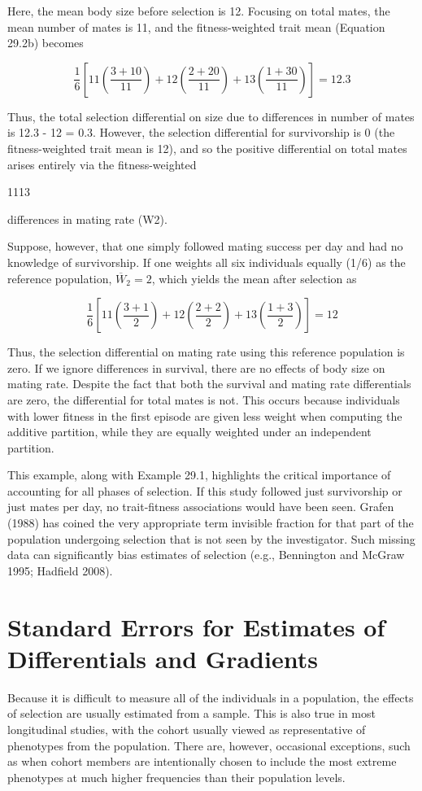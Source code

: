 \documentclass{article}
\begin{document}
Here, the mean body size before selection is 12. Focusing on total mates, the mean number of mates is 11, and the fitness-weighted trait mean (Equation 29.2b) becomes

\begin{equation}
\frac{1}{6}\left[11\left(\frac{3+10}{11}\right)+12\left(\frac{2+20}{11}\right)+13\left(\frac{1+30}{11}\right)\right]=12.3
\end{equation}

Thus, the total selection differential on size due to differences in number of mates is 12.3 - 12 = 0.3. However, the selection differential for survivorship is 0 (the fitness-weighted trait mean is 12), and so the positive differential on total mates arises entirely via the fitness-weighted

1113

differences in mating rate (W2).

Suppose, however, that one simply followed mating success per day and had no knowledge of survivorship. If one weights all six individuals equally (1/6) as the reference population,  $ \overline{W}_2 = 2 $, which yields the mean after selection as

\begin{equation}
\frac{1}{6}\left[11\left(\frac{3+1}{2}\right)+12\left(\frac{2+2}{2}\right)+13\left(\frac{1+3}{2}\right)\right]=12
\end{equation}

Thus, the selection differential on mating rate using this reference population is zero. If we ignore differences in survival, there are no effects of body size on mating rate. Despite the fact that both the survival and mating rate differentials are zero, the differential for total mates is not. This occurs because individuals with lower fitness in the first episode are given less weight when computing the additive partition, while they are equally weighted under an independent partition.

This example, along with Example 29.1, highlights the critical importance of accounting for all phases of selection. If this study followed just survivorship or just mates per day, no trait-fitness associations would have been seen. Grafen (1988) has coined the very appropriate term invisible fraction for that part of the population undergoing selection that is not seen by the investigator. Such missing data can significantly bias estimates of selection (e.g., Bennington and McGraw 1995; Hadfield 2008).

\section{Standard Errors for Estimates of Differentials and Gradients}
Because it is difficult to measure all of the individuals in a population, the effects of selection are usually estimated from a sample. This is also true in most longitudinal studies, with the cohort usually viewed as representative of phenotypes from the population. There are, however, occasional exceptions, such as when cohort members are intentionally chosen to include the most extreme phenotypes at much higher frequencies than their population levels.
\end{document}
